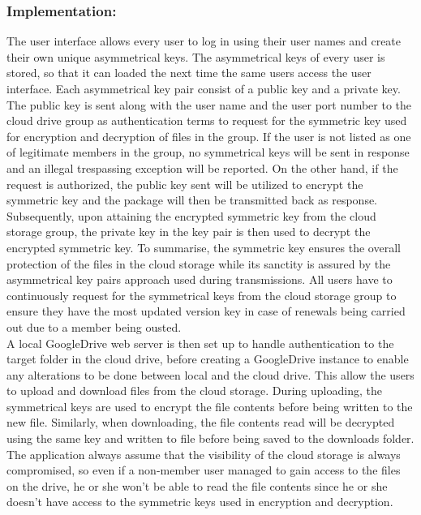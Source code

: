 \documentclass[12pt]{article}
\begin{document}
\subsubsection*{Implementation:}
The user interface allows every user to log in using their user names and create their own unique asymmetrical keys. The asymmetrical keys of every user is stored, so that it can loaded the next time the same users access the user interface. Each asymmetrical key pair consist of a public key and a private key. The public key is sent along with the user name and the user port number to the cloud drive group as authentication terms to request for the symmetric key used for encryption and decryption of files in the group. If the user is not listed as one of legitimate members in the group, no symmetrical keys will be sent in response and an illegal trespassing exception will be reported. On the other hand, if the request is authorized, the public key sent will be utilized to encrypt the symmetric key and the package will then be transmitted back as response. \\

Subsequently, upon attaining the encrypted symmetric key from the cloud storage group, the private key in the key pair is then used to decrypt the encrypted symmetric key. To summarise, the symmetric key ensures the overall protection of the files in the cloud storage while its sanctity is assured by the asymmetrical key pairs approach used during transmissions. All users have to continuously request for the symmetrical keys from the cloud storage group to ensure they have the most updated version key in case of renewals being carried out due to a member being ousted.\\

A local GoogleDrive web server is then set up to handle authentication to the target folder in the cloud drive, before creating a GoogleDrive instance to enable any alterations to be done between local and the cloud drive. This allow the users to upload and download files from the cloud storage. During uploading, the symmetrical keys are used to encrypt the file contents before being written to the new file. Similarly, when downloading, the file contents read will be decrypted using the same key and written to file before being saved to the downloads folder. The application always assume that the visibility of the cloud storage is always compromised, so even if a non-member user managed to gain access to the files on the drive, he or she won't be able to read the file contents since he or she doesn't have access to the symmetric keys used in encryption and decryption. \\
\end{document}
